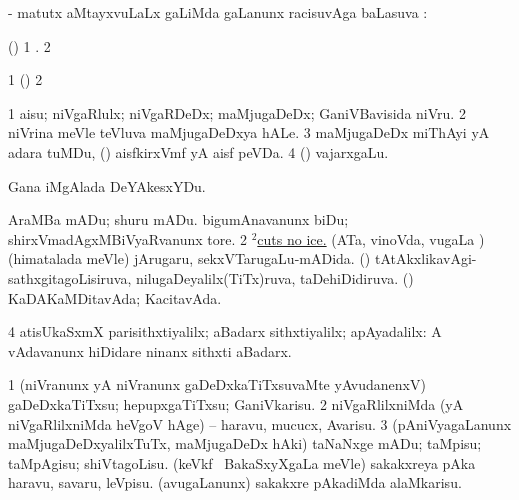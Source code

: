 \bentry
{}
\gl{\uparx}
\bmng
- matutx  aMtayxvuLaLx \gu gaLiMda \kirxvi gaLanunx racisuvAga baLasuva \uparx:  
\emng
\eentry

\bentry
{}
\gl{\saMkiSx}
\bmng
{} 
\emng
\eentry

\bentry
{}
\gl{\saMkiSx}
\bmng
{} 
\emng
\eentry

\bentry
{}
\gl{\saMkiSx}
\bmng
(\ame) 
\bnum
\num{1} . 
\num{2}  
\enum
\emng
\eentry

\bentry
{}
\gl{\saMkiSx}
\bmng
\bnum
\num{1} (\birx)  
\num{2}  
\enum
\emng
\eentry

\bentry
{}
\gl{\nA}
\bmng
\bnum
\num{1} aisu; niVgaRlulx; niVgaRDeDx; maMjugaDeDx; GaniVBavisida niVru. 
\num{2} niVrina meVle teVluva maMjugaDeDxya hALe. 
\num{3} maMjugaDeDx miThAyi yA adara tuMDu, \kanmu (\birx) aisfkirxVmf yA aisf peVDa. 
\num{4} (\ashi) vajarxgaLu. 
\enum
\emng

\noindent
\gl{\pagu}
\bmng
{} Gana iMgAlada DeYAkesxYDu. 
\emng

\noindent
\gl{\nuga}
\bmng
\bnum
{}  
\banum
{} AraMBa mADu; shuru mADu. 
 bigumAnavanunx biDu; shirxVmadAgxMBiVyaRvanunx tore. 
\eanum
\numie
\num{2} \hyperref{kandict_c.pdf}{C}{cut(2) nuga(21)}{$^2$cuts no ice.} 
  
\banum
{} (ATa, vinoVda, \mo vugaLa \vi) (himatalada meVle) jArugaru, sekxVTarugaLu-mADida. 
 (\AmA) tAtAkxlikavAgi-sathxgitagoLisiruva, nilugaDeyalilx(TiTx)ruva, taDehiDidiruva. 
 (\AmA) KaDAKaMDitavAda; KacitavAda. 
\eanum
\numie
\num{4}  atisUkaSxmX parisithxtiyalilx; aBadarx sithxtiyalilx; apAyadalilx:  A vAdavanunx hiDidare ninanx sithxti aBadarx. 
\enum
\emng
\eentry

\bentry
{}
\gl{\sakirx}
\bmng
\bnum
\num{1} (niVranunx yA niVranunx gaDeDxkaTiTxsuvaMte yAvudanenxV) gaDeDxkaTiTxsu; hepupxgaTiTxsu; GaniVkarisu. 
\num{2} niVgaRlilxniMda (yA niVgaRlilxniMda heVgoV hAge) -- haravu, mucucx, Avarisu. 
\num{3} (pAniVyagaLanunx maMjugaDeDxyalilxTuTx, maMjugaDeDx hAki) taNaNxge mADu; taMpisu; taMpAgisu; shiVtagoLisu. 
 (keVkf \mo\ BakaSxyXgaLa meVle) 
\banum
{} sakakxreya pAka haravu, savaru, leVpisu. 
 (avugaLanunx) sakakxre pAkadiMda alaMkarisu. 
\eanum
\numie
\enum
\emng

